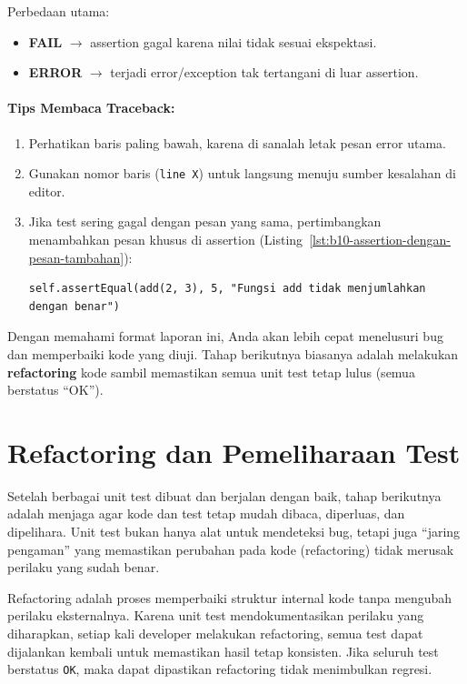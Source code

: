 Perbedaan utama:
\begin{itemize}
    \item \textbf{FAIL} $\rightarrow$ assertion gagal karena nilai tidak sesuai ekspektasi.
    \item \textbf{ERROR} $\rightarrow$ terjadi error/exception tak tertangani di luar assertion.
\end{itemize}

\paragraph{Tips Membaca Traceback:}
\begin{enumerate}
    \item Perhatikan baris paling bawah, karena di sanalah letak pesan error utama.
    \item Gunakan nomor baris (\texttt{line X}) untuk langsung menuju sumber kesalahan di editor.
    \item Jika test sering gagal dengan pesan yang sama, pertimbangkan menambahkan pesan khusus di assertion (Listing~\ref{lst:b10-assertion-dengan-pesan-tambahan}):
\begin{lstlisting}[style=PythonStyle, caption={Assertion dengan pesan tambahan}, label={lst:b10-assertion-dengan-pesan-tambahan}]
self.assertEqual(add(2, 3), 5, "Fungsi add tidak menjumlahkan dengan benar")
\end{lstlisting}
\end{enumerate}

Dengan memahami format laporan ini, Anda akan lebih cepat menelusuri bug dan memperbaiki kode yang diuji.  
Tahap berikutnya biasanya adalah melakukan \textbf{refactoring} kode sambil memastikan semua unit test tetap lulus (semua berstatus “OK”).


\section{Refactoring dan Pemeliharaan Test}

Setelah berbagai unit test dibuat dan berjalan dengan baik, tahap berikutnya adalah menjaga agar kode dan test tetap mudah dibaca, diperluas, dan dipelihara.  
Unit test bukan hanya alat untuk mendeteksi bug, tetapi juga “jaring pengaman” yang memastikan perubahan pada kode (refactoring) tidak merusak perilaku yang sudah benar.

Refactoring adalah proses memperbaiki struktur internal kode tanpa mengubah perilaku eksternalnya.  
Karena unit test mendokumentasikan perilaku yang diharapkan, setiap kali developer melakukan refactoring, semua test dapat dijalankan kembali untuk memastikan hasil tetap konsisten.  
Jika seluruh test berstatus \texttt{OK}, maka dapat dipastikan refactoring tidak menimbulkan regresi.


